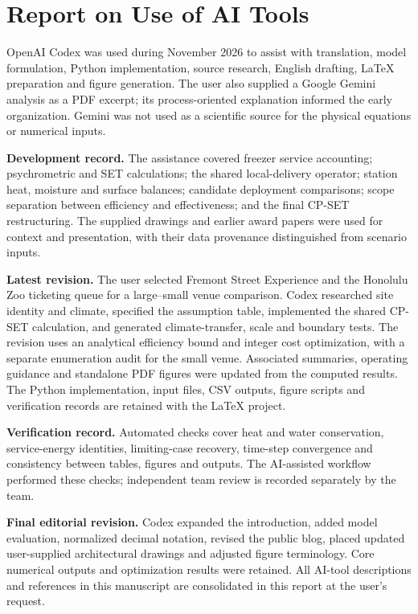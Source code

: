 \section*{Report on Use of AI Tools}
OpenAI Codex was used during November 2026 to assist with translation, model formulation, Python implementation, source research, English drafting, LaTeX preparation and figure generation. The user also supplied a Google Gemini analysis as a PDF excerpt; its process-oriented explanation informed the early organization. Gemini was not used as a scientific source for the physical equations or numerical inputs.

\noindent\textbf{Development record.} The assistance covered freezer service accounting; psychrometric and SET calculations; the shared local-delivery operator; station heat, moisture and surface balances; candidate deployment comparisons; scope separation between efficiency and effectiveness; and the final CP-SET restructuring. The supplied drawings and earlier award papers were used for context and presentation, with their data provenance distinguished from scenario inputs.

\noindent\textbf{Latest revision.} The user selected Fremont Street Experience and the Honolulu Zoo ticketing queue for a large--small venue comparison. Codex researched site identity and climate, specified the assumption table, implemented the shared CP-SET calculation, and generated climate-transfer, scale and boundary tests. The revision uses an analytical efficiency bound and integer cost optimization, with a separate enumeration audit for the small venue. Associated summaries, operating guidance and standalone PDF figures were updated from the computed results. The Python implementation, input files, CSV outputs, figure scripts and verification records are retained with the LaTeX project.

\noindent\textbf{Verification record.} Automated checks cover heat and water conservation, service-energy identities, limiting-case recovery, time-step convergence and consistency between tables, figures and outputs. The AI-assisted workflow performed these checks; independent team review is recorded separately by the team.

\noindent\textbf{Final editorial revision.} Codex expanded the introduction, added model evaluation, normalized decimal notation, revised the public blog, placed updated user-supplied architectural drawings and adjusted figure terminology. Core numerical outputs and optimization results were retained. All AI-tool descriptions and references in this manuscript are consolidated in this report at the user's request.

